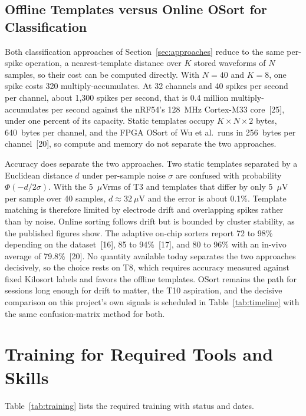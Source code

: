 \documentclass[11pt]{article}
\begin{document}
\subsection{Offline Templates versus Online OSort for Classification}
Both classification approaches of Section~\ref{sec:approaches} reduce to the same per-spike
operation, a nearest-template distance over $K$ stored waveforms of $N$ samples, so their
cost can be computed directly. With $N = 40$ and $K = 8$, one spike costs
320 multiply-accumulates. At 32 channels and 40 spikes per second per channel, about
1{,}300 spikes per second, that is 0.4 million multiply-accumulates per second against the
nRF54's 128~MHz Cortex-M33 core~[25], under one percent of its capacity. Static templates occupy $K \times N \times 2$ bytes, 640~bytes per channel, and the FPGA OSort of
Wu et al.\ runs in 256~bytes per channel~[20], so compute and memory do not separate the
two approaches.

Accuracy does separate the two approaches. Two static templates separated by a
Euclidean distance $d$ under per-sample noise $\sigma$ are confused with probability
$\Phi(-d/2\sigma)$. With the 5~$\mu$Vrms of T3 and templates that differ by only 5~$\mu$V
per sample over 40 samples, $d \approx 32~\mu$V and the error is about 0.1\%. Template matching is
therefore limited by electrode drift and overlapping spikes rather than by noise. Online
sorting follows drift but is bounded by cluster stability, as the published figures show. The adaptive on-chip sorters report
72 to 98\% depending on the dataset~[16], 85 to 94\%~[17], and 80 to 96\% with an in-vivo
average of 79.8\%~[20]. No quantity available today separates the two approaches
decisively, so the choice rests on T8, which requires accuracy measured against fixed
Kilosort labels and favors the offline templates. OSort remains the path for sessions long
enough for drift to matter, the T10 aspiration, and the decisive comparison on this
project's own signals is scheduled in Table~\ref{tab:timeline} with the same
confusion-matrix method for both.
\section{Training for Required Tools and Skills}
Table~\ref{tab:training} lists the required training with status and dates.
\end{document}
